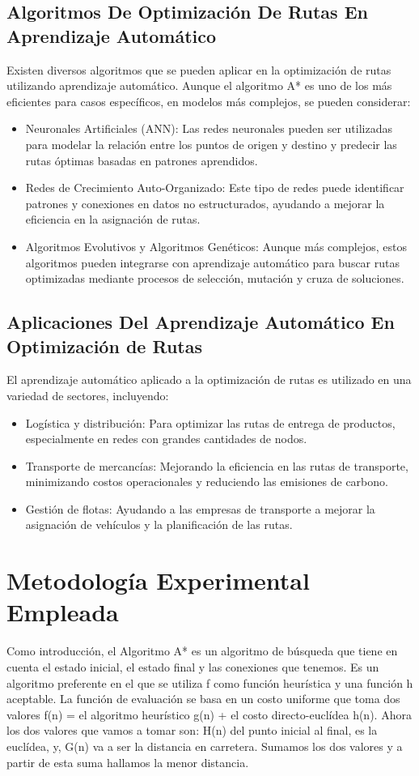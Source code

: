 \documentclass[conference]{IEEEtran}
\begin{document}
	\subsection{Algoritmos De Optimización De Rutas En Aprendizaje Automático}
	Existen diversos algoritmos que se pueden aplicar en la optimización de rutas utilizando aprendizaje automático. Aunque el algoritmo A* es uno de los más eficientes para casos específicos, en modelos más complejos, se pueden considerar:
	\begin{itemize}
		\item Neuronales Artificiales (ANN): Las redes neuronales pueden ser utilizadas para modelar la relación entre los puntos de origen y destino y predecir las rutas óptimas basadas en patrones aprendidos.
		\item Redes de Crecimiento Auto-Organizado: Este tipo de redes puede identificar patrones y conexiones en datos no estructurados, ayudando a mejorar la eficiencia en la asignación de rutas.
		\item Algoritmos Evolutivos y Algoritmos Genéticos: Aunque más complejos, estos algoritmos pueden integrarse con aprendizaje automático para buscar rutas optimizadas mediante procesos de selección, mutación y cruza de soluciones.
	\end{itemize}
	
	\subsection{Aplicaciones Del Aprendizaje Automático En Optimización de Rutas}
	El aprendizaje automático aplicado a la optimización de rutas es utilizado en una variedad de sectores, incluyendo:
	\begin{itemize}
		\item Logística y distribución: Para optimizar las rutas de entrega de productos, especialmente en redes con grandes cantidades de nodos.
		\item Transporte de mercancías: Mejorando la eficiencia en las rutas de transporte, minimizando costos operacionales y reduciendo las emisiones de carbono.
		\item Gestión de flotas: Ayudando a las empresas de transporte a mejorar la asignación de vehículos y la planificación de las rutas.
	\end{itemize}
	
	\section{Metodología Experimental Empleada}
	Como introducción, el Algoritmo A* es un algoritmo de búsqueda que tiene en cuenta el estado inicial, el estado final y las conexiones que tenemos. Es un algoritmo preferente en el que se utiliza f como función heurística y una función h aceptable. La función de evaluación se basa en un costo uniforme que toma dos valores f(n) = el algoritmo heurístico g(n) + el costo directo-euclídea h(n). Ahora los dos valores que vamos a tomar son: H(n) del punto inicial al final, es la euclídea, y, G(n) va a ser la distancia en carretera. Sumamos los dos valores y a partir de esta suma hallamos la menor distancia.
\end{document}
